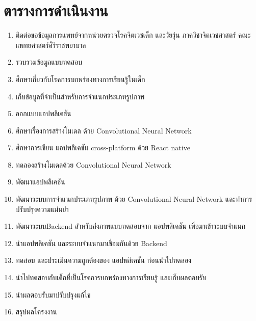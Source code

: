 \documentclass[12pt,oneside,openright,a4paper]{cpe-thai-project}
\begin{document}
\section{ตารางการดำเนินงาน}
\begin{enumerate}
  \item ติดต่อขอข้อมูลการแพทย์จากหน่วยตรวจโรคจิตเวชเด็ก และวัยรุ่น ภาควิชาจิตเวชศาสตร์ คณะแพทยศาสตร์ศิริราชพยาบาล
  \item รวบรวมข้อมูลแบบทดสอบ
  \item ศึกษาเกี่ยวกับโรคการบกพร่องทางการเรียนรู้ในเด็ก
  \item เก็บข้อมูลที่จำเป็นสำหรับการจำแนกประเภทรูปภาพ
  \item ออกแบบแอปพลิเคชัน
  \item ศึกษาเรื่องการสร้างโมเดล ด้วย Convolutional Neural Network
  \item ศึกษาการเขียน แอปพลิเคชัน cross-platform ด้วย React native
  \item ทดลองสร้างโมเดลด้วย Convolutional Neural Network
  \item พัฒนาแอปพลิเคชัน
  \item พัฒนาระบบการจำแนกประเภทรูปภาพ ด้วย Convolutional Neural Network และทำการปรับปรุงความแม่นยำ
  \item พัฒนาระบบBackend สำหรับส่งภาพแบบทดสอบจาก แอปพลิเคชัน เพื่อมาเข้าระบบจำแนก
  \item นำแอปพลิเคชัน และระบบจำแนกมาเชื่อมกันด้วย Backend
  \item ทดสอบ และประเมินความถูกต้องของ แอปพลิเคชัน ก่อนนำไปทดลอง
  \item นำไปทดสอบกับเด็กที่เป็นโรคการบกพร่องทางการเรียนรู้ และเก็บผลตอบรับ
  \item นำผลตอบรับมาปรับปรุงแก้ไข
  \item สรุปผลโครงงาน
\end{enumerate}
\end{document}
